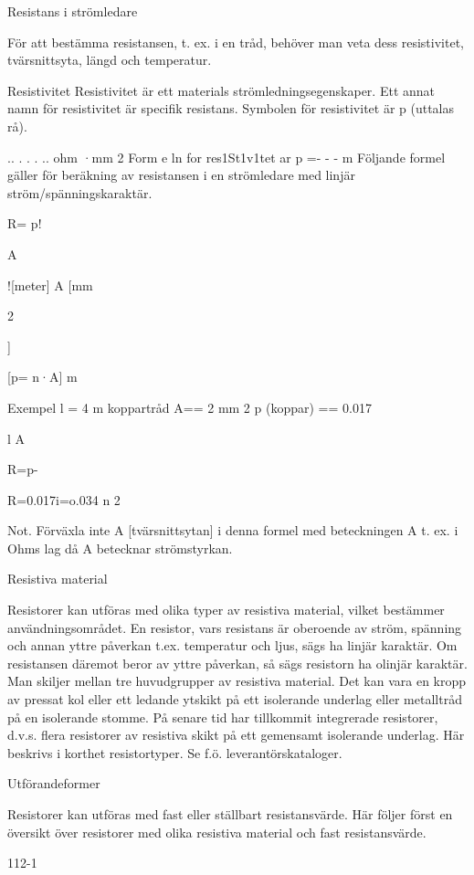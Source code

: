 \documentclass[a4paper,twoside,twocolumn,openright]{book}
\begin{document}
{{Resistans i strömledare

För att bestämma resistansen, t. ex. i en tråd,
behöver man veta dess resistivitet, tvärsnittsyta, längd och temperatur.

Resistivitet
Resistivitet är ett materials strömledningsegenskaper. Ett annat namn för resistivitet
är specifik resistans. Symbolen för resistivitet
är p (uttalas rå).

..
. . . ..
ohm ·mm 2
Form e ln for res1St1v1tet ar p =- - - m
Följande formel gäller för beräkning av
resistansen i en strömledare med linjär ström/spänningskaraktär.

R= p!

A

![meter] A [mm

2

]

[p= n·A]
m

Exempel
l = 4 m koppartråd
A== 2 mm 2
p (koppar) == 0.017

l
A

R=p-

R=0.017i=o.034 n
2

Not. Förväxla inte A [tvärsnittsytan] i denna
formel med beteckningen A t. ex. i Ohms lag då A
betecknar strömstyrkan.

Resistiva material

Resistorer kan utföras med olika typer av
resistiva material, vilket bestämmer användningsområdet.
En resistor, vars resistans är oberoende
av ström, spänning och annan yttre påverkan t.ex. temperatur och ljus, sägs ha linjär
karaktär. Om resistansen däremot beror av
yttre påverkan, så sägs resistorn ha olinjär
karaktär.
Man skiljer mellan tre huvudgrupper av
resistiva material. Det kan vara en kropp av
pressat kol eller ett ledande ytskikt på ett
isolerande underlag eller metalltråd på en
isolerande stomme. På senare tid har tillkommit integrerade resistorer, d.v.s. flera
resistorer av resistiva skikt på ett gemensamt isolerande underlag. Här beskrivs i
korthet
resistortyper. Se f.ö. leverantörskataloger.

Utförandeformer

Resistorer kan utföras med fast eller ställbart resistansvärde. Här följer först en översikt över resistorer med olika resistiva material och fast resistansvärde.

112-1

}}
\end{document}
